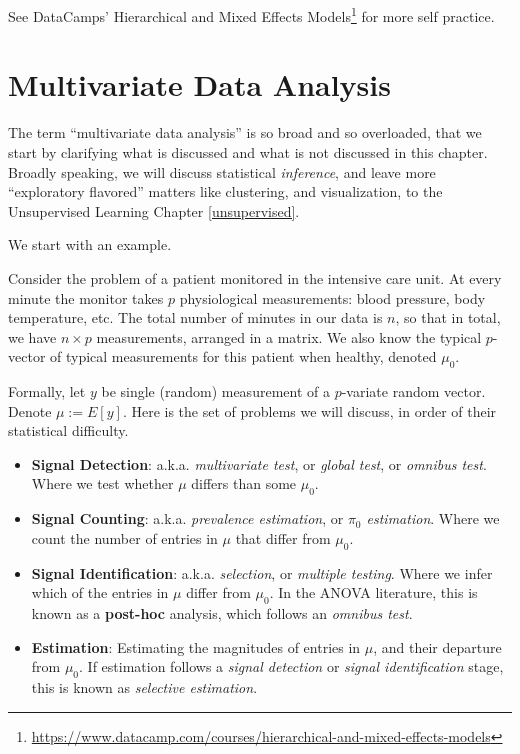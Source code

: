 \documentclass[]{book}
\renewcommand{\href}[2]{#2\footnote{\url{#1}}}
\theoremstyle{definition}
\theoremstyle{definition}
\theoremstyle{definition}
\theoremstyle{remark}
\let\BeginKnitrBlock\begin \let\EndKnitrBlock\end
\begin{document}
See DataCamps' \href{https://www.datacamp.com/courses/hierarchical-and-mixed-effects-models}{Hierarchical and Mixed Effects Models} for more self practice.

\hypertarget{multivariate}{%
\chapter{Multivariate Data Analysis}\label{multivariate}}

The term ``multivariate data analysis'' is so broad and so overloaded, that we start by clarifying what is discussed and what is not discussed in this chapter.
Broadly speaking, we will discuss statistical \emph{inference}, and leave more ``exploratory flavored'' matters like clustering, and visualization, to the Unsupervised Learning Chapter \ref{unsupervised}.

We start with an example.

\BeginKnitrBlock{example}
\protect\hypertarget{exm:icu}{}{\label{exm:icu} }Consider the problem of a patient monitored in the intensive care unit.
At every minute the monitor takes \(p\) physiological measurements: blood pressure, body temperature, etc.
The total number of minutes in our data is \(n\), so that in total, we have \(n \times p\) measurements, arranged in a matrix.
We also know the typical \(p\)-vector of typical measurements for this patient when healthy, denoted \(\mu_0\).
\EndKnitrBlock{example}

Formally, let \(y\) be single (random) measurement of a \(p\)-variate random vector.
Denote \(\mu:=E[y]\).
Here is the set of problems we will discuss, in order of their statistical difficulty.

\begin{itemize}
\item
  \textbf{Signal Detection}:
  a.k.a. \emph{multivariate test}, or \emph{global test}, or \emph{omnibus test}.
  Where we test whether \(\mu\) differs than some \(\mu_0\).
\item
  \textbf{Signal Counting}:
  a.k.a. \emph{prevalence estimation}, or \emph{\(\pi_0\) estimation}.
  Where we count the number of entries in \(\mu\) that differ from \(\mu_0\).
\item
  \textbf{Signal Identification}:
  a.k.a. \emph{selection}, or \emph{multiple testing}.
  Where we infer which of the entries in \(\mu\) differ from \(\mu_0\).
  In the ANOVA literature, this is known as a \textbf{post-hoc} analysis, which follows an \emph{omnibus test}.
\item
  \textbf{Estimation}:
  Estimating the magnitudes of entries in \(\mu\), and their departure from \(\mu_0\).
  If estimation follows a \emph{signal detection} or \emph{signal identification} stage, this is known as \emph{selective estimation}.
\end{itemize}
\end{document}
